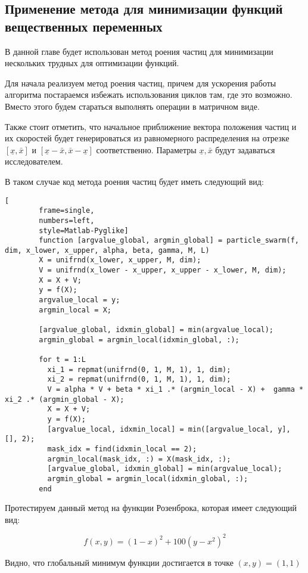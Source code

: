 \documentclass[../main.tex]{subfiles}
\begin{document}
	\subsection{Применение метода для минимизации функций вещественных переменных}
	В данной главе будет использован метод роения частиц для минимизации нескольких трудных для оптимизации функций.
	
	Для начала реализуем метод роения частиц, причем для ускорения работы алгоритма постараемся избежать использования циклов там, где это возможно. Вместо этого будем стараться выполнять операции в матричном виде.
	
	Также стоит отметить, что начальное приближение вектора положения частиц и их скоростей будет генерироваться из равномерного распределения на отрезке $[\underline{x}, \bar{x}]$ и $[\underline{x} - \bar{x}, \bar{x} - \underline{x}]$ соответственно. Параметры $\underline{x},  \bar{x}$ будут задаваться исследователем.
	
	В таком случае код метода роения частиц будет иметь следующий вид:
	
	\begin{lstlisting}[
		frame=single,
		numbers=left,
		style=Matlab-Pyglike]
		function [argvalue_global, argmin_global] = particle_swarm(f, dim, x_lower, x_upper, alpha, beta, gamma, M, L) 
		X = unifrnd(x_lower, x_upper, M, dim);
		V = unifrnd(x_lower - x_upper, x_upper - x_lower, M, dim); 
		X = X + V;
		y = f(X);
		argvalue_local = y;
		argmin_local = X;
		
		[argvalue_global, idxmin_global] = min(argvalue_local);
		argmin_global = argmin_local(idxmin_global, :);
		
		for t = 1:L
		  xi_1 = repmat(unifrnd(0, 1, M, 1), 1, dim);
		  xi_2 = repmat(unifrnd(0, 1, M, 1), 1, dim);
	 	  V = alpha * V + beta * xi_1 .* (argmin_local - X) +  gamma * xi_2 .* (argmin_global - X);
		  X = X + V;
		  y = f(X);
		  [argvalue_local, idxmin_local] = min([argvalue_local, y], [], 2);
		  mask_idx = find(idxmin_local == 2);
		  argmin_local(mask_idx, :) = X(mask_idx, :);
		  [argvalue_global, idxmin_global] = min(argvalue_local);
		  argmin_global = argmin_local(idxmin_global, :);
		end
	\end{lstlisting}
	
	Протестируем данный метод на функции Розенброка, которая имеет следующий вид:
	
	\[f(x, y) = (1 - x)^2 + 100(y-x^2)^2\]
	
	Видно, что глобальный минимум функции достигается в точке $(x, y) = (1, 1)$
	
\end{document}
